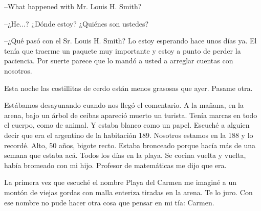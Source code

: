\documentclass[12pt,twoside,openright,a5paper]{book}
\begin{document}
\---What happened with Mr. Louis H. Smith?

\---¿He...? ¿Dónde estoy? ¿Quiénes son ustedes?

\---¿Qué pasó con el Sr. Louis H. Smith? Lo estoy esperando hace
unos días ya. El tenía que traerme un paquete muy importante y estoy a
punto de perder la paciencia. Por suerte parece que lo mandó a usted a arreglar
cuentas con nosotros.

\vspace{0.5cm}

\hrulefill\hspace{0.2cm} \decofourleft\decofourright \hspace{0.2cm} \hrulefill
\vspace{0.5cm}

Esta noche las costillitas de cerdo están menos grasosas que ayer. Pasame
otra.

\vspace{0.5cm}

\hrulefill\hspace{0.2cm} \decofourleft\decofourright \hspace{0.2cm} \hrulefill
\vspace{0.5cm}

Estábamos desayunando cuando nos llegó el comentario. A la mañana, en la
arena, bajo un árbol de ceibas apareció muerto un turista. Tenía marcas
en todo el cuerpo, como de animal. Y estaba blanco como un papel. Escuché
a alguien decir que era el argentino de la habitación 189. Nosotros estamos
en la 188 y lo recordé. Alto, 50 años, bigote recto. Estaba bronceado
porque hacía más de una semana que estaba acá. Todos los días en la
playa. Se cocina vuelta y vuelta, había bromeado con mi hijo. Profesor de
matemáticas me dijo que era.

\vspace{0.5cm}

\hrulefill\hspace{0.2cm} \decofourleft\decofourright \hspace{0.2cm} \hrulefill
\vspace{0.5cm}

La primera vez que escuché el nombre Playa del Carmen me imaginé a un
montón de viejas gordas con malla enteriza tiradas en la arena. Te lo
juro. Con ese nombre no pude hacer otra cosa que pensar en mi tía: Carmen.

\vspace{0.5cm}
\end{document}
